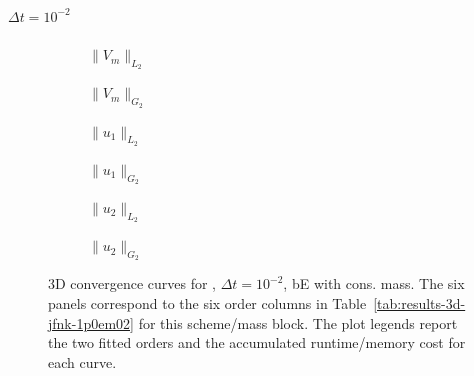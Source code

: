 \subsubsection{}
\paragraph{$\Delta t=10^{-2}$}

\begin{figure}[p]
\centering
\begin{subfigure}{0.485\linewidth}
\centering
{}
\caption{$\|V_m\|_{L_2}$}
\label{fig:results-3d-jfnk-1p0em02-backwardeuler-consistent-a}
\end{subfigure}
\hfill
\begin{subfigure}{0.485\linewidth}
\centering
{}
\caption{$\|V_m\|_{G_2}$}
\label{fig:results-3d-jfnk-1p0em02-backwardeuler-consistent-b}
\end{subfigure}
\par\vspace{0.8em}
\begin{subfigure}{0.485\linewidth}
\centering
{}
\caption{$\|u_1\|_{L_2}$}
\label{fig:results-3d-jfnk-1p0em02-backwardeuler-consistent-c}
\end{subfigure}
\hfill
\begin{subfigure}{0.485\linewidth}
\centering
{}
\caption{$\|u_1\|_{G_2}$}
\label{fig:results-3d-jfnk-1p0em02-backwardeuler-consistent-d}
\end{subfigure}
\par\vspace{0.8em}
\begin{subfigure}{0.485\linewidth}
\centering
{}
\caption{$\|u_2\|_{L_2}$}
\label{fig:results-3d-jfnk-1p0em02-backwardeuler-consistent-e}
\end{subfigure}
\hfill
\begin{subfigure}{0.485\linewidth}
\centering
{}
\caption{$\|u_2\|_{G_2}$}
\label{fig:results-3d-jfnk-1p0em02-backwardeuler-consistent-f}
\end{subfigure}
\caption{3D convergence curves for , $\Delta t=10^{-2}$, bE with cons. mass. The six panels correspond to the six order columns in Table~\ref{tab:results-3d-jfnk-1p0em02} for this scheme/mass block. The plot legends report the two fitted orders and the accumulated runtime/memory cost for each curve.}
\label{fig:results-3d-jfnk-1p0em02-backwardeuler-consistent}
\end{figure}
\FloatBarrier

